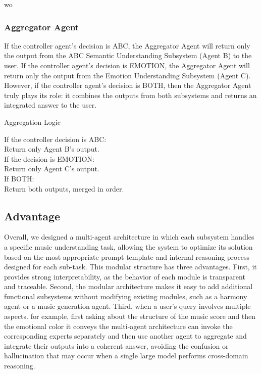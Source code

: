 wo\documentclass[sigconf]{acmart}
\begin{document}
\subsubsection{Aggregator Agent}
If the controller agent’s decision is ABC, the Aggregator Agent will return only the output from the ABC Semantic Understanding Subsystem (Agent B) to the user. If the controller agent’s decision is EMOTION, the Aggregator Agent will return only the output from the Emotion Understanding Subsystem (Agent C). However, if the controller agent’s decision is BOTH, then the Aggregator Agent truly plays its role: it combines the outputs from both subsystems and returns an integrated answer to the user.
\begin{promptbox}{Aggregation Logic}

If the controller decision is ABC:\\
    Return only Agent B's output.\\

If the decision is EMOTION:\\
    Return only Agent C's output.\\

If BOTH:\\
    Return both outputs, merged in order.\\
\end{promptbox}

\subsection{Advantage}
Overall, we designed a multi-agent architecture in which each subsystem handles a specific music understanding task, allowing the system to optimize its solution based on the most appropriate prompt template and internal reasoning process designed for each sub-task. This modular structure has three advantages. First, it provides strong interpretability, as the behavior of each module is transparent and traceable. Second, the modular architecture makes it easy to add additional functional subsystems without modifying existing modules, such as a harmony agent or a music generation agent. Third, when a user’s query involves multiple aspects. for example, first asking about the structure of the music score and then the emotional color it conveys the multi-agent architecture can invoke the corresponding experts separately and then use another agent to aggregate and integrate their outputs into a coherent answer, avoiding the confusion or hallucination that may occur when a single large model performs cross-domain reasoning.
\end{document}
